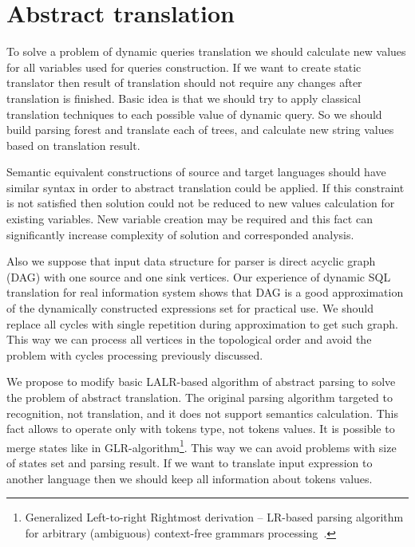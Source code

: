 \documentclass{llncs}
\begin{document}



\section{Abstract translation}
\label{sec:AbstractTranslation}

To solve a problem of dynamic queries translation we should calculate new values for all variables used 
for queries construction. If we want to create static translator then result of translation should not 
require any changes after translation is finished. Basic idea is that we should try to apply classical 
translation techniques to each possible value of dynamic query. So we should build parsing forest and 
translate each of trees, and calculate new string values based on translation result.

Semantic equivalent constructions of source and target languages should have similar syntax in order to 
abstract translation could be applied. If this constraint is not satisfied then solution could not be
 reduced to new values calculation for existing variables. New variable creation may be required and 
this fact can significantly increase complexity of solution and corresponded analysis.

Also we suppose that input data structure for parser is direct acyclic graph (DAG) with one source and 
one sink vertices. Our experience of dynamic SQL translation for real information system shows that DAG 
is a good approximation of the dynamically constructed expressions set for practical use. We should replace 
all cycles with single repetition during approximation to get such graph. This way we can process all vertices 
in the topological order and avoid the problem with cycles processing previously discussed.

We propose to modify basic LALR-based algorithm of abstract parsing to solve the problem of abstract 
translation. The original parsing algorithm targeted to recognition, not translation, and it does not 
support semantics calculation. This fact allows to operate only with tokens type, not tokens values. 
It is possible to merge states like in GLR-algorithm\footnote{Generalized Left-to-right Rightmost 
derivation -- LR-based parsing algorithm for arbitrary (ambiguous) context-free grammars 
processing~\cite{Grune}.}. This way we can avoid problems with size of states set and parsing result.
 If we want to translate input expression to another language then we should keep all information 
about tokens values. 
\end{document}
